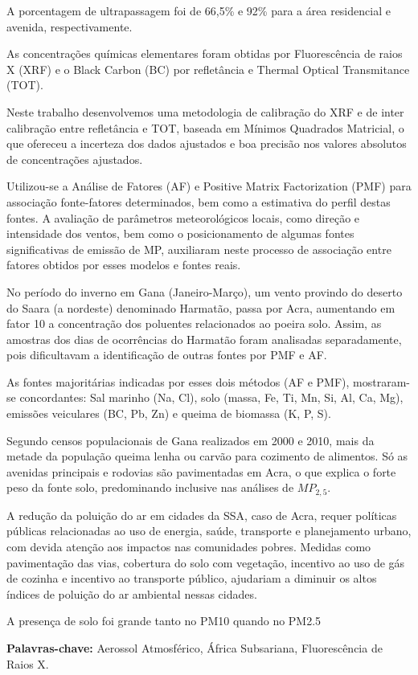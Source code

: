 A porcentagem de ultrapassagem foi de 66,5\% e 92\% para 
a área residencial e avenida, respectivamente. 

As concentrações químicas elementares foram obtidas por 
Fluorescência de raios X (XRF) e o Black Carbon (BC) por 
refletância e Thermal Optical Transmitance (TOT). 

Neste trabalho desenvolvemos uma metodologia de calibração do XRF 
e de inter calibração entre refletância e TOT, 
baseada em Mínimos Quadrados Matricial, o que ofereceu a 
incerteza dos dados ajustados e boa precisão nos valores 
absolutos de concentrações ajustados.

Utilizou-se a Análise de Fatores (AF) e Positive Matrix 
Factorization (PMF) para associação fonte-fatores determinados, 
bem como a estimativa do perfil destas fontes. 
A avaliação de parâmetros meteorológicos locais, como direção 
e intensidade dos ventos, bem como o posicionamento de algumas 
fontes significativas de emissão de MP, auxiliaram neste processo 
de associação entre fatores obtidos por esses modelos e 
fontes reais. 

No período do inverno em Gana (Janeiro-Março), um vento  
provindo do deserto do Saara (a nordeste) denominado Harmatão, 
passa por Acra, aumentando em fator 10 a concentração dos poluentes 
relacionados ao poeira solo. Assim, as amostras dos dias de ocorrências 
do Harmatão foram analisadas separadamente, pois dificultavam a 
identificação de outras fontes por PMF e AF.

As fontes majoritárias indicadas por esses dois métodos (AF e PMF), 
mostraram-se concordantes: Sal marinho (Na, Cl), solo (massa, Fe, Ti, Mn, 
Si, Al, Ca, Mg), emissões veiculares (BC, Pb, Zn) e queima de 
biomassa (K, P, S). 

Segundo censos populacionais de Gana realizados em 2000 e 2010, 
mais da metade da população queima lenha ou carvão para cozimento 
de alimentos. 
Só as avenidas principais e rodovias são pavimentadas em Acra, 
o que explica o forte peso da fonte solo, predominando 
inclusive nas análises de $MP_{2,5}$.

A redução da poluição do ar em cidades da SSA, caso de Acra, 
requer políticas públicas relacionadas ao uso de energia, saúde, 
transporte e planejamento urbano, com devida atenção 
aos impactos nas comunidades pobres. 
Medidas como pavimentação das vias, cobertura do solo com vegetação, 
incentivo ao uso de gás de cozinha e incentivo ao transporte público, 
ajudariam a diminuir os altos índices de poluição do ar ambiental nessas cidades.

A presença de solo foi grande tanto no PM10 quando no PM2.5

\par
\vspace{1em}
\noindent\textbf{Palavras-chave:}  Aerossol Atmosférico, África Subsariana, Fluorescência de Raios X.
\newpage
